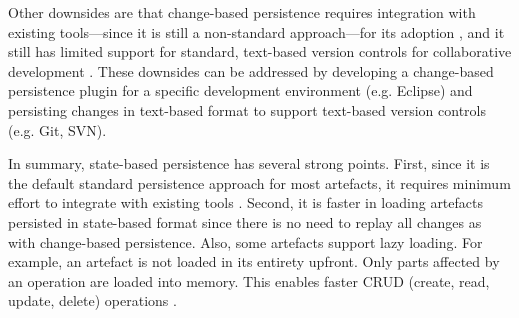
Other downsides are that change-based persistence requires
integration with existing tools—since it is still a non-standard approach—for its adoption \cite{koegel2010emfstore},
and it still has limited support for standard, text-based version controls for collaborative development \cite{koegel2010emfstore}.
These downsides can be addressed by developing a change-based persistence plugin for a specific development environment
(e.g. Eclipse) and persisting changes in text-based format to support text-based version controls (e.g. Git, SVN).

In summary, state-based persistence has several strong points. First, since it is the default standard persistence approach for most artefacts, it requires minimum effort to integrate with existing tools \cite{koegel2010emfstore}. Second, it is faster in loading artefacts persisted in state-based format since there is no need to replay all changes as with change-based persistence. Also, some artefacts support lazy loading. For example, an artefact is not loaded in its entirety upfront. Only parts affected by an operation are loaded into memory. This enables faster CRUD (create, read, update, delete) operations \cite{DBLP:conf/models/Espinazo-PaganCM11,daniel2016neoemf}.

